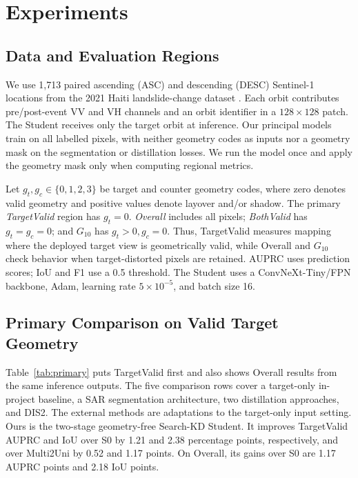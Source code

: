 \section{Experiments}
\label{sec:experiments}

\subsection{Data and Evaluation Regions}
We use 1,713 paired ascending (ASC) and descending (DESC) Sentinel-1 locations from the 2021 Haiti landslide-change dataset \cite{Bralet2024DataPort}. Each orbit contributes pre/post-event VV and VH channels and an orbit identifier in a $128\times128$ patch. The Student receives only the target orbit at inference. Our principal models train on all labelled pixels, with neither geometry codes as inputs nor a geometry mask on the segmentation or distillation losses. We run the model once and apply the geometry mask only when computing regional metrics.

Let $g_t,g_c\in\{0,1,2,3\}$ be target and counter geometry codes, where zero denotes valid geometry and positive values denote layover and/or shadow. The primary \emph{TargetValid} region has $g_t=0$. \emph{Overall} includes all pixels; \emph{BothValid} has $g_t=g_c=0$; and $G_{10}$ has $g_t>0,g_c=0$. Thus, TargetValid measures mapping where the deployed target view is geometrically valid, while Overall and $G_{10}$ check behavior when target-distorted pixels are retained. AUPRC uses prediction scores; IoU and F1 use a 0.5 threshold. The Student uses a ConvNeXt-Tiny/FPN backbone, Adam, learning rate $5\times10^{-5}$, and batch size 16.

\subsection{Primary Comparison on Valid Target Geometry}
Table~\ref{tab:primary} puts TargetValid first and also shows Overall results from the same inference outputs. The five comparison rows cover a target-only in-project baseline, a SAR segmentation architecture, two distillation approaches, and DIS2. The external methods are adaptations to the target-only input setting. Ours is the two-stage geometry-free Search-KD Student. It improves TargetValid AUPRC and IoU over S0 by 1.21 and 2.38 percentage points, respectively, and over Multi2Uni by 0.52 and 1.17 points. On Overall, its gains over S0 are 1.17 AUPRC points and 2.18 IoU points.

